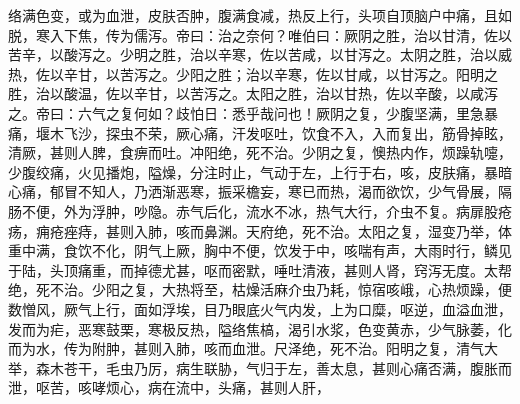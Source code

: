\documentclass[a4paper,12pt,UTF8,twoside]{ctexbook}
\begin{document}
络满色变，或为血泄，皮肤否肿，腹满食减，热反上行，头项自顶脑户中痛，且如脱，寒入下焦，传为儒泻。帝曰：治之奈何？唯伯曰：厥阴之胜，治以甘清，佐以苦辛，以酸泻之。少明之胜，治以辛寒，佐以苦咸，以甘泻之。太阴之胜，治以威热，佐以辛甘，以苦泻之。少阳之胜；治以辛寒，佐以甘咸，以甘泻之。阳明之胜，治以酸温，佐以辛甘，以苦泻之。太阳之胜，治以甘热，佐以辛酸，以咸泻之。帝曰：六气之复何如？歧怕日：悉乎哉问也！厥阴之复，少腹坚满，里急暴痛，堰木飞沙，探虫不荣，厥心痛，汗发呕吐，饮食不入，入而复出，筋骨掉眩，清厥，甚则人脾，食痹而吐。冲阳绝，死不治。少阴之复，懊热内作，烦躁轨嚏，少腹绞痛，火见播炮，隘燥，分注时止，气动于左，上行于右，咳，皮肤痛，暴暗心痛，郁冒不知人，乃洒渐恶寒，振采檐妄，寒已而热，渴而欲饮，少气骨展，隔肠不便，外为浮肿，吵隐。赤气后化，流水不冰，热气大行，介虫不复。病扉股疮疡，痈疮痤痔，甚则入肺，咳而鼻渊。天府绝，死不治。太阳之复，湿变乃举，体重中满，食饮不化，阴气上厥，胸中不便，饮发于中，咳喘有声，大雨时行，鳞见于陆，头顶痛重，而掉德尤甚，呕而密默，唾吐清液，甚则人肾，窍泻无度。太帮绝，死不治。少阳之复，大热将至，枯燥活麻介虫乃耗，惊宿咳峨，心热烦躁，便数憎风，厥气上行，面如浮埃，目乃眼底火气内发，上为口糜，呕逆，血溢血泄，发而为疟，恶寒鼓栗，寒极反热，隘络焦槁，渴引水浆，色变黄赤，少气脉萎，化而为水，传为附肿，甚则入肺，咳而血泄。尺泽绝，死不治。阳明之复，清气大举，森木苍干，毛虫乃厉，病生联胁，气归于左，善太息，甚则心痛否满，腹胀而泄，呕苦，咳哮烦心，病在流中，头痛，甚则人肝，
\end{document}
